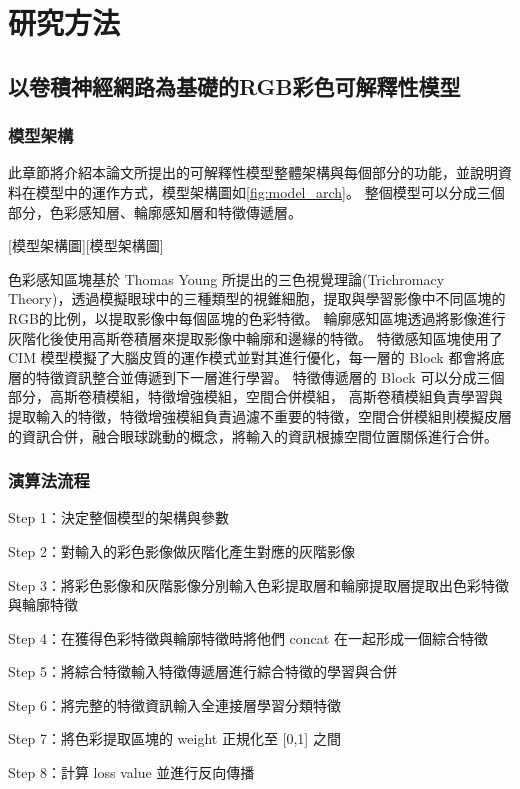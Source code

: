 \documentclass[class=NCU_thesis, crop=false]{standalone}
\begin{document}
\chapter{研究方法}

\section{以卷積神經網路為基礎的RGB彩色可解釋性模型}
\subsection{模型架構}

此章節將介紹本論文所提出的可解釋性模型整體架構與每個部分的功能，並說明資料在模型中的運作方式，模型架構圖如\cref{fig:model_arch}。
整個模型可以分成三個部分，色彩感知層、輪廓感知層和特徵傳遞層。

[模型架構圖][模型架構圖]


色彩感知區塊基於 Thomas Young 所提出的三色視覺理論(Trichromacy Theory)\cite{}，透過模擬眼球中的三種類型的視錐細胞，提取與學習影像中不同區塊的RGB的比例，以提取影像中每個區塊的色彩特徵。
輪廓感知區塊透過將影像進行灰階化後使用高斯卷積層來提取影像中輪廓和邊緣的特徵。
特徵感知區塊使用了 CIM 模型模擬了大腦皮質的運作模式並對其進行優化，每一層的 Block 都會將底層的特徵資訊整合並傳遞到下一層進行學習。 特徵傳遞層的 Block 可以分成三個部分，高斯卷積模組，特徵增強模組，空間合併模組，
高斯卷積模組負責學習與提取輸入的特徵，特徵增強模組負責過濾不重要的特徵，空間合併模組則模擬皮層的資訊合併，融合眼球跳動的概念，將輸入的資訊根據空間位置關係進行合併。


\subsection{演算法流程}
Step 1：決定整個模型的架構與參數

Step 2：對輸入的彩色影像做灰階化產生對應的灰階影像

Step 3：將彩色影像和灰階影像分別輸入色彩提取層和輪廓提取層提取出色彩特徵與輪廓特徵

Step 4：在獲得色彩特徵與輪廓特徵時將他們 concat 在一起形成一個綜合特徵

Step 5：將綜合特徵輸入特徵傳遞層進行綜合特徵的學習與合併

Step 6：將完整的特徵資訊輸入全連接層學習分類特徵

Step 7：將色彩提取區塊的 weight 正規化至 [0,1] 之間

Step 8：計算 loss value 並進行反向傳播
\end{document}
